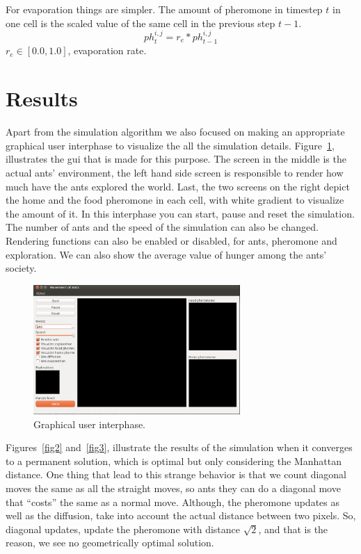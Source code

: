 \documentclass[paper=a4, fontsize=11pt]{scrartcl} %
\numberwithin{equation}{section} %
\numberwithin{figure}{section} %
\numberwithin{table}{section} %
\begin{document}
For evaporation things are simpler. The amount of pheromone in timestep $t$ in one cell is the scaled value of the same cell in the previous step $t-1$. 
\begin{equation}
{ph}_t^{i,j} = r_e * {ph}_{t-1}^{i,j}
\end{equation}
$r_e \in [0.0,1.0]$, evaporation rate.\\

\section{Results}
\label{results}
Apart from the simulation algorithm we also focused on making an appropriate graphical user interphase to visualize the all the simulation details. Figure~\ref{fig1}, illustrates the gui that is made for this purpose. 
The screen in the middle is the actual ants' environment, the left hand side screen is responsible to render how much have the ants explored the world. Last, the two screens on the right depict the home and the food pheromone in each cell, with white gradient to visualize the amount of it. In this interphase you can start, pause and reset the simulation. The number of ants and the speed of the simulation can also be changed. Rendering functions can also be enabled or disabled, for ants, pheromone and exploration. We can also show the average value of hunger among the ants' society.

\begin{figure}[h!]
  \caption{Graphical user interphase.}
  \label{fig1}
  \centering
    \includegraphics[width=0.7\textwidth]{gui.png}
\end{figure}

Figures~\ref{fig2} and~\ref{fig3}, illustrate the results of the simulation when it converges to a permanent solution, which is optimal but only considering the Manhattan distance. One thing that lead to this strange behavior is that we count diagonal moves the same as all the straight moves, so ants they can do a diagonal move that ``costs'' the same as a normal move. Although, the pheromone updates as well as the diffusion, take into account the actual distance between two pixels. So, diagonal updates, update the pheromone with distance $\sqrt{2}$, and that is the reason, we see no geometrically optimal solution.
\end{document}
